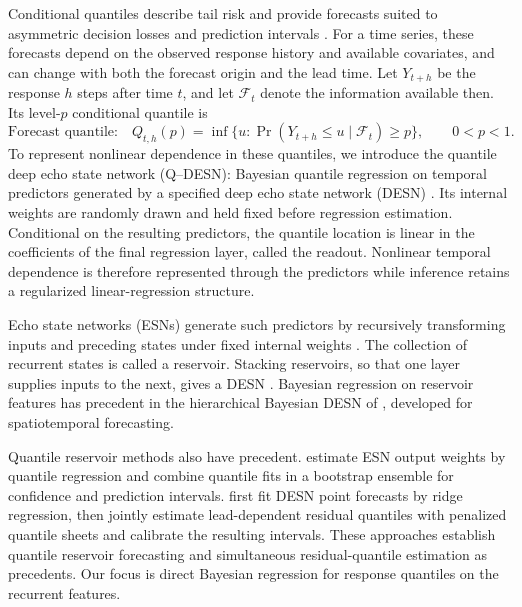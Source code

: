 \documentclass[12pt,letterpaper]{article}
\numberwithin{equation}{section}
\begin{document}
Conditional quantiles describe tail risk and provide forecasts suited to
asymmetric decision losses and prediction intervals
\citep{KoenkerBassett1978,Koenker2005,Gneiting2011}. For a time series,
these forecasts depend on the observed response history and available
covariates, and can change with both the forecast origin and the lead time.
Let \(Y_{t+h}\) be the response \(h\) steps after time \(t\), and let
\(\mathcal F_t\) denote the information available then. Its level-\(p\)
conditional quantile is
\[
\text{Forecast quantile:}\quad
Q_{t,h}(p)=\inf\{u:\Pr(Y_{t+h}\le u\mid\mathcal F_t)\ge p\},
\qquad 0<p<1.
\]
To represent nonlinear dependence in these quantiles, we introduce the
quantile deep echo state network (Q--DESN): Bayesian quantile regression on
temporal predictors generated by a specified deep echo state network (DESN)
\citep{GallicchioMicheliPedrelli2018DeepESNDesign}. Its internal weights are
randomly drawn and held fixed before regression estimation. Conditional on
the resulting predictors, the quantile location is linear in the coefficients
of the final regression layer, called the readout. Nonlinear temporal
dependence is therefore represented through the predictors while inference
retains a regularized linear-regression structure.

Echo state networks (ESNs) generate such predictors by recursively transforming
inputs and preceding states under fixed internal weights
\citep{Jaeger2001EchoState,LukoseviciusJaeger2009ReservoirComputing}.
The collection of recurrent states is called a reservoir. Stacking reservoirs,
so that one layer supplies inputs to the next, gives a DESN
\citep{GallicchioMicheliPedrelli2018DeepESNDesign}. Bayesian regression on
reservoir features has precedent in the hierarchical Bayesian DESN of
\citet{McDermottWikle2018DeepESNUQ}, developed for spatiotemporal forecasting.

Quantile reservoir methods also have precedent.
\citet{LvZhaoLiuWang2016QRESNE} estimate ESN output weights by quantile
regression and combine quantile fits in a bootstrap ensemble for confidence
and prediction intervals. \citet{BonasWikleCastruccio2024CalibratedDeepESN}
first fit DESN point forecasts by ridge regression, then jointly estimate
lead-dependent residual quantiles with penalized quantile sheets and
calibrate the resulting intervals. These approaches establish quantile
reservoir forecasting and simultaneous residual-quantile estimation as
precedents. Our focus is direct Bayesian regression for response quantiles
on the recurrent features.
\end{document}
